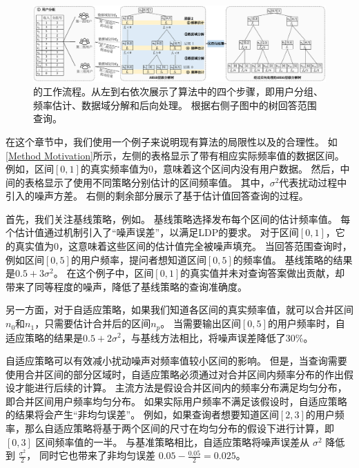 \begin{figure}[t]
    \centering
    \includegraphics[width=\hsize]{figure/ldp_range_query/figures_others/OverviewAHEAD4ch.pdf}
    \caption{\myahead 的工作流程。从左到右依次展示了\myahead 算法中的四个步骤，即用户分组、频率估计、数据域分解和后向处理。 
    \myahead 根据右侧子图中的树回答范围查询。} 
    \label{AHEAD method}   
\end{figure}

在这个章节中，我们使用一个例子来说明现有算法的局限性以及\myahead 的合理性。
如\autoref{Method Motivation}所示，左侧的表格显示了带有相应实际频率值的数据区间。
例如，区间$[0,1]$的真实频率值为$0$，意味着这个区间内没有用户数据。
然后，中间的表格显示了使用不同策略分别估计的区间频率值。
其中，$\sigma^2$代表扰动过程中引入的噪声方差。
右侧的剩余部分展示了基于估计值回答查询的过程。

首先，我们关注基线策略，例如\myhio。
基线策略选择发布每个区间的估计频率值。
每个估计值通过\fo 机制引入了“噪声误差”，以满足LDP的要求。
对于区间$[0,1]$，它的真实值为$0$，这意味着这些区间的估计值完全被噪声填充。
当回答范围查询时，例如区间$[0,5]$的用户频率，提问者想知道区间$[0,5]$的频率值。
基线策略的结果是$0.5 + 3\sigma^2$。
在这个例子中，区间$[0,1]$的真实值并未对查询答案做出贡献，却带来了同等程度的噪声，降低了基线策略的查询准确度。

另一方面，对于自适应策略，如果我们知道各区间的真实频率值，就可以合并区间$n_0$和$n_1$，只需要估计合并后的区间$n_p$。
当需要输出区间$[0,5]$的用户频率时，自适应策略的结果是$0.5 + 2\sigma^2$，与基线方法相比，将噪声误差降低了30\%。

自适应策略可以有效减小扰动噪声对频率值较小区间的影响。
但是，当查询需要使用合并区间的部分区域时，自适应策略必须通过对合并区间内频率分布的作出假设才能进行后续的计算。
主流方法是假设合并区间内的频率分布满足均匀分布\cite{ioannidis2003history}，即合并区间用户频率均匀分布。
如果实际用户频率不满足该假设时，自适应策略的结果将会产生“非均匀误差”。
例如，如果查询者想要知道区间$[2,3]$的用户频率，那么自适应策略将基于两个区间的尺寸在均匀分布的假设下进行计算，即 $[0,3]$ 区间频率值的一半。
与基准策略相比，自适应策略将噪声误差从 $\sigma^2$ 降低到 $\frac{\sigma^2}{2}$，
同时它也带来了非均匀误差 $0.05 - \frac{0.05}{2} = 0.025$。

